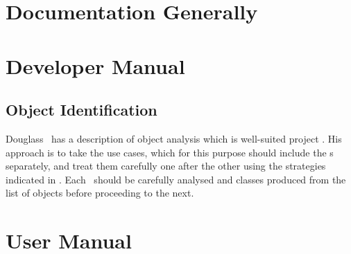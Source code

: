 
\section{Documentation Generally}\label{sec:OP_MGT}

\section{Developer Manual}\label{sec:DevMan}

%
%
\subsection{Object Identification}\label{sec:objdisc}
Douglass~\cite[\S\,5]{douglass} has a description of object analysis which is well-suited
project \nep. His approach is to take the use cases, which for this purpose should
include the \papp s separately, and treat them carefully one after the other using
the strategies indicated in .
Each \papp\ should be carefully analysed and classes produced from the list of objects
before proceeding to the next.

\section{User Manual}\label{sec:UMan}

%
